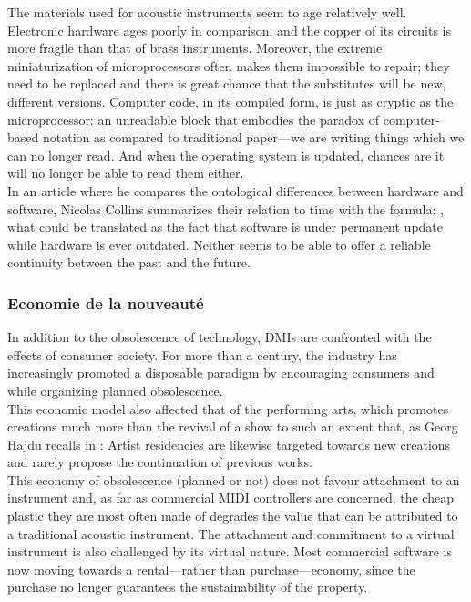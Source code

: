 The materials used for acoustic instruments seem to age relatively well. Electronic hardware ages poorly in comparison, and the copper of its circuits is more fragile than that of brass instruments. Moreover, the extreme miniaturization of microprocessors often makes them impossible to repair; they need to be replaced and there is great chance that the substitutes will be new, different versions. Computer code, in its compiled form, is just as cryptic as the microprocessor: an unreadable block that embodies the paradox of computer-based notation as compared to traditional paper—we are writing things which we can no longer read. And when the operating system is updated, chances are it will no longer be able to read them either.\\
In an article where he compares the ontological differences between hardware and software, Nicolas Collins \cite{collins_semiconducting_2013} summarizes their relation to time with the formula: , what could be translated as the fact that software is under permanent update while hardware is ever outdated. Neither seems to be able to offer a reliable continuity between the past and the future.


	
\subsubsection{Economie de la nouveauté}

In addition to the obsolescence of technology, DMIs are confronted with the effects of consumer society. For more than a century, the industry has increasingly promoted a disposable paradigm by encouraging consumers  \cite{slade_made_2006} and while organizing planned obsolescence.\\
\indent This economic model also affected that of the performing arts, which promotes creations much more than the revival of a show to such an extent that, as Georg Hajdu recalls in \cite{hajdu_disposable_2016}:  Artist residencies are likewise targeted towards new creations and rarely propose the continuation of previous works.\\
\indent This economy of obsolescence (planned or not) does not favour attachment to an instrument and, as far as commercial MIDI controllers are concerned, the cheap plastic they are most often made of degrades the value that can be attributed to a traditional acoustic instrument. The attachment and commitment to a virtual instrument is also challenged by its virtual nature. Most commercial software is now moving towards a rental—rather than purchase—economy, since the purchase no longer guarantees the sustainability of the property.
	
